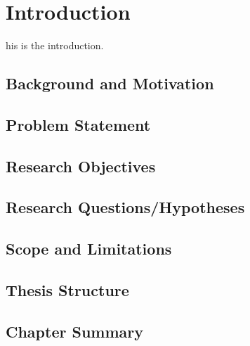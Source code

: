 \chapter{Introduction} \label{ch01}

his is the introduction.


\section{Background and Motivation}

\section{Problem Statement}

\section{Research Objectives}

\section{Research Questions/Hypotheses}

\section{Scope and Limitations}

\section{Thesis Structure}

\section{Chapter Summary}


